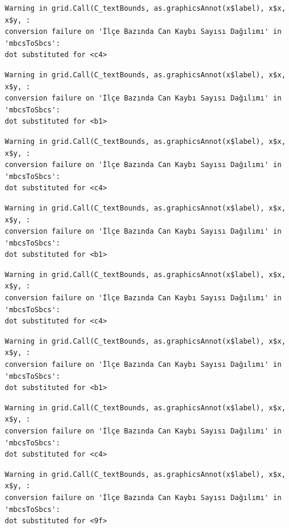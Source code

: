 \documentclass[
  11pt,
  a4paper,
  DIV=11,
  numbers=noendperiod]{scrartcl}
\begin{document}
\begin{verbatim}
Warning in grid.Call(C_textBounds, as.graphicsAnnot(x$label), x$x, x$y, :
conversion failure on 'İlçe Bazında Can Kaybı Sayısı Dağılımı' in 'mbcsToSbcs':
dot substituted for <c4>
\end{verbatim}

\begin{verbatim}
Warning in grid.Call(C_textBounds, as.graphicsAnnot(x$label), x$x, x$y, :
conversion failure on 'İlçe Bazında Can Kaybı Sayısı Dağılımı' in 'mbcsToSbcs':
dot substituted for <b1>
\end{verbatim}

\begin{verbatim}
Warning in grid.Call(C_textBounds, as.graphicsAnnot(x$label), x$x, x$y, :
conversion failure on 'İlçe Bazında Can Kaybı Sayısı Dağılımı' in 'mbcsToSbcs':
dot substituted for <c4>
\end{verbatim}

\begin{verbatim}
Warning in grid.Call(C_textBounds, as.graphicsAnnot(x$label), x$x, x$y, :
conversion failure on 'İlçe Bazında Can Kaybı Sayısı Dağılımı' in 'mbcsToSbcs':
dot substituted for <b1>
\end{verbatim}

\begin{verbatim}
Warning in grid.Call(C_textBounds, as.graphicsAnnot(x$label), x$x, x$y, :
conversion failure on 'İlçe Bazında Can Kaybı Sayısı Dağılımı' in 'mbcsToSbcs':
dot substituted for <c4>
\end{verbatim}

\begin{verbatim}
Warning in grid.Call(C_textBounds, as.graphicsAnnot(x$label), x$x, x$y, :
conversion failure on 'İlçe Bazında Can Kaybı Sayısı Dağılımı' in 'mbcsToSbcs':
dot substituted for <b1>
\end{verbatim}

\begin{verbatim}
Warning in grid.Call(C_textBounds, as.graphicsAnnot(x$label), x$x, x$y, :
conversion failure on 'İlçe Bazında Can Kaybı Sayısı Dağılımı' in 'mbcsToSbcs':
dot substituted for <c4>
\end{verbatim}

\begin{verbatim}
Warning in grid.Call(C_textBounds, as.graphicsAnnot(x$label), x$x, x$y, :
conversion failure on 'İlçe Bazında Can Kaybı Sayısı Dağılımı' in 'mbcsToSbcs':
dot substituted for <9f>
\end{verbatim}
\end{document}

